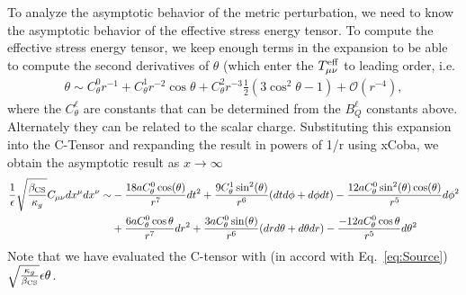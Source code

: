\documentclass[aps,prd,amsmath,showpacs,amssymb,superscriptaddress,nofootinbib,longbibliography,eqsecnum,preprintnumbers]{revtex4-1}
\newcommand{\bcs}{\beta_{\rm CS}}
\begin{document}
To analyze the asymptotic behavior of the metric perturbation, we need to know the asymptotic behavior of the effective stress energy tensor. To compute the effective stress energy tensor, we keep enough terms in the expansion to be able to compute the second derivatives of $\theta$ (which enter the $T_{\mu\nu}^{\rm eff}$ to leading order, i.e.
\begin{align}
\theta \sim C_\theta^0r^{-1}+C_\theta^1r^{-2}\cos\theta +C_\theta^2r^{-3}\frac{1}{2}(3\cos^2\theta -1) +\mathcal{O}(r^{-4}),
\end{align}
where the $C^\ell_\theta$ are constants that can be determined from the $B_Q^\ell$ constants above. Alternately they can be related to the scalar charge. Substituting this expansion into the C-Tensor and rexpanding the result in powers of 1/r using xCoba, we obtain the asymptotic result as $x\to \infty$ 
\begin{align}
\frac{1}{\epsilon}\sqrt{\frac{\bcs}{\kappa_g}}C_{\mu\nu}dx^\mu dx^\nu \sim &-\frac{18 a C_\theta^0  \cos (\theta )}{r^7}dt^2
+\frac{9 C_\theta^1  \sin ^2(\theta )}{r^6}(dtd\phi +d\phi dt) 
-\frac{12 a C_\theta^0  \sin ^2(\theta ) \cos (\theta )}{r^5}d\phi^2 \nonumber \\
&+\frac{6a C_\theta^0\cos\theta}{r^7}dr^2 
+\frac{3 a C_\theta^0  \sin (\theta )}{r^6} (drd\theta+d\theta dr)
-\frac{-12aC_\theta^0  \cos\theta}{r^5}d\theta^2
\end{align}
Note that we have evaluated the C-tensor with (in accord with Eq.~\eqref{eq:Source}) $\sqrt{\frac{\kappa_g }{\bcs}}\epsilon\theta$.

\end{document}

